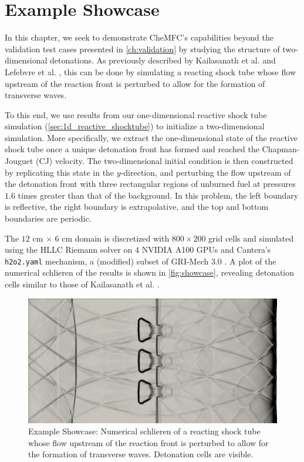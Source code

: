 \chapter{Example Showcase}
\label{ch:example}

In this chapter, we seek to demonstrate CheMFC's capabilities beyond the validation
test cases presented in \autoref{ch:validation} by studying the structure
of two-dimensional detonations. As previously described by Kailasanath et al.
\cite{KAILASANATH1985199} and Lefebvre et al. \cite{LEFEBVRE1993206}, this can
be done by simulating a reacting shock tube whose flow upstream of the reaction
front is perturbed to allow for the formation of transverse waves.

To this end, we use results from our one-dimensional reactive shock tube simulation
(\autoref{sec:1d_reactive_shocktube}) to initialize a two-dimensional simulation.
More specifically, we extract the one-dimensional state of the reactive shock tube
once a unique detonation front has formed and reached the Chapman-Jouguet (CJ) velocity.
The two-dimensional initial condition is then constructed by replicating this state
in the $y$-direction, and perturbing the flow upstream of the detonation front with
three rectangular regions of unburned fuel at pressures $1.6$ times greater than that
of the background. In this problem, the left boundary is reflective, the right boundary
is extrapolative, and the top and bottom boundaries are periodic.

The $12$ \si{\centi\meter} $\times$ $6$ \si{\centi\meter} domain is discretized
with $800 \times 200$ grid cells and simulated using the HLLC Riemann solver on
$4$ NVIDIA A100 GPUs and Cantera's \verb|h2o2.yaml| mechanism, a (modified) subset of GRI-Mech 3.0 \cite{GRI30}. A plot
of the numerical schlieren of the results
is shown in \autoref{fig:showcase}, revealing detonation cells similar to those
of Kailasanath et al. \cite{KAILASANATH1985199}.

\begin{figure}
    \includegraphics[width=\textwidth]{figures/showcase/simulation.png}
    \caption{Example Showcase: Numerical schlieren of a reacting shock tube whose flow upstream of the reaction
    front is perturbed to allow for the formation of transverse waves. Detonation cells are visible.}\label{fig:showcase}
\end{figure}